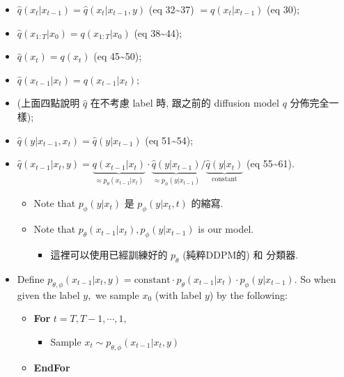\documentclass[
]{article}
\providecommand{\tightlist}{%
  \setlength{\itemsep}{0pt}\setlength{\parskip}{0pt}}\usepackage{longtable,booktabs,array}
\theoremstyle{remark}
\begin{document}
\begin{itemize}
  \begin{itemize}
  \item
    \(\widehat{q}(x_{t}\vert x_{t-1})=\widehat{q}(x_{t}\vert x_{t-1},y)\)
    (eq 32\textasciitilde37) \(= q(x_t\vert x_{t-1})\) (eq 30);
  \item
    \(\widehat{q}(x_{1:T}\vert x_0)= q(x_{1:T}\vert x_0)\) (eq
    38\textasciitilde44);
  \item
    \(\widehat{q}(x_t)=q(x_t)\) (eq 45\textasciitilde50);
  \item
    \(\widehat{q}(x_{t-1}\vert x_{t}) = q(x_{t-1}\vert x_{t})\);
  \item
    (上面四點說明 \(\widehat{q}\) 在不考慮 label 時, 跟之前的 diffusion
    model \(q\) 分佈完全一樣);
  \item
    \(\widehat{q}(y\vert x_{t-1},x_{t}) = \widehat{q}(y\vert x_{t-1})\)
    (eq 51\textasciitilde54);
  \item
    \(\widehat{q}(x_{t-1}\vert x_{t},y) = \underbrace{q(x_{t-1}\vert x_{t})}_{\approx p_{\theta}(x_{t-1}\vert x_{t})} \cdot \underbrace{\widehat{q}(y\vert x_{t-1})}_{\approx p_{\phi}(y\vert x_{t-1})} \Big/ \underbrace{\widehat{q}(y\vert x_{t})}_{\text{constant}}\)
    (eq 55\textasciitilde61).

    \begin{itemize}
    \tightlist
    \item
      Note that \(p_{\phi}(y\vert x_t)\) 是 \(p_{\phi}(y\vert x_t,t)\)
      的縮寫.
    \item
      Note that
      \(p_{\theta}(x_{t-1}\vert x_{t}), p_{\phi}(y\vert x_{t-1})\) is
      our model.

      \begin{itemize}
      \tightlist
      \item
        這裡可以使用已經訓練好的 \(p_{\theta}\) (純粹DDPM的) 和 分類器.
      \end{itemize}
    \end{itemize}
  \item
    Define
    \(p_{\theta,\phi}(x_{t-1}\vert x_t,y) = \text{constant}\cdot  p_{\theta}(x_{t-1}\vert x_{t}) \cdot p_{\phi}(y\vert x_{t-1}).\)
    So when given the label \(y,\) we sample \(x_0\) (with label \(y\))
    by the following:

    \begin{itemize}
    \tightlist
    \item
      \textbf{For} \(t=T,T-1,\cdots,1,\)

      \begin{itemize}
      \tightlist
      \item
        Sample \(x_t\sim p_{\theta,\phi}(x_{t-1}\vert x_t,y)\)
      \end{itemize}
    \item
      \textbf{EndFor}
    \end{itemize}


\end{itemize}
\end{itemize}
\end{document}
